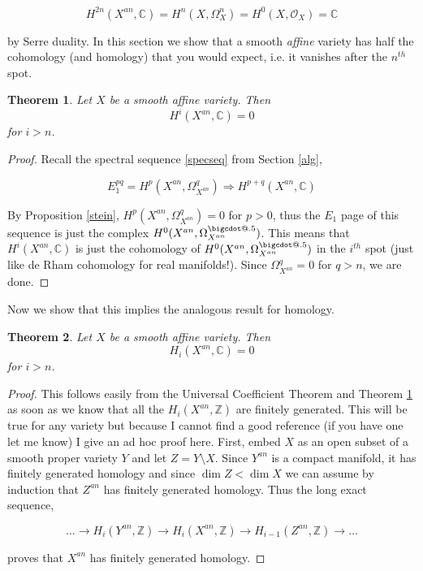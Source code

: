 \documentclass[a4paper]{article}
\makeatletter
\newcommand{\OO}{\mathcal{O}}
\newcommand{\C}{\mathbb{C}}
\newcommand{\Z}{\mathbb{Z}}
\newcommand*\bigcdot{\mathpalette\bigcdot@{.5}}
\newcommand*\bigcdot@[2]{\mathbin{\vcenter{\hbox{\scalebox{#2}{$\m@th#1\bullet$}}}}}
\newtheorem{theorem}{Theorem}
\numberwithin{theorem}{section}
\numberwithin{equation}{section}
\makeatother
\begin{document}
$$ H^{2n}(X^{an},\C) = H^n(X,\Omega_X^n) = H^0(X,\OO_X) = \C $$

by Serre duality. In this section we show that a smooth \textit{affine} variety has half the cohomology (and homology) that you would expect, i.e. it vanishes after the $n^{th}$ spot.

\begin{theorem} \label{cohom}
    Let $X$ be a smooth affine variety. Then
    $$ H^i(X^{an},\C) = 0 $$
    for $i > n$.
\end{theorem}

\begin{proof}
    Recall the spectral sequence \ref{specseq} from Section \ref{alg},

    $$ E_1^{pq} = H^p(X^{an},\Omega_{X^{an}}^q) \Rightarrow H^{p+q}(X^{an},\C) $$

    By Proposition \ref{stein}, $H^p(X^{an},\Omega_{X^{an}}^q) = 0$ for $p > 0$, thus the $E_1$ page of this sequence is just the complex $H^0(X^{an},\Omega_{X^{an}}^{\bigcdot})$. This means that $H^i(X^{an},\C)$ is just the cohomology of $H^0(X^{an},\Omega_{X^{an}}^{\bigcdot})$ in the $i^{th}$ spot (just like de Rham cohomology for real manifolds!). Since $\Omega_{X^{an}}^q = 0$ for $q > n$, we are done.
\end{proof}

Now we show that this implies the analogous result for homology.

\begin{theorem} \label{hom}
    Let $X$ be a smooth affine variety. Then
    $$ H_i(X^{an},\C) = 0 $$
    for $i > n$.
\end{theorem}
\begin{proof}
    This follows easily from the Universal Coefficient Theorem and Theorem \ref{cohom} as soon as we know that all the $H_i(X^{an},\Z)$ are finitely generated. This will be true for any variety but because I cannot find a good reference (if you have one let me know) I give an ad hoc proof here. 
    First, embed $X$ as an open subset of a smooth proper variety $Y$ and let $Z = Y \setminus X$. Since $Y^{an}$ is a compact manifold, it has finitely generated homology and since $\dim Z < \dim X$ we can assume by induction that $Z^{an}$ has finitely generated homology. Thus the long exact sequence,

    $$ \dots \rightarrow H_{i}(Y^{an},\Z) \rightarrow H_i(X^{an},\Z) \rightarrow H_{i-1}(Z^{an},\Z) \rightarrow \dots $$

    proves that $X^{an}$ has finitely generated homology.
    
\end{proof}
\end{document}
